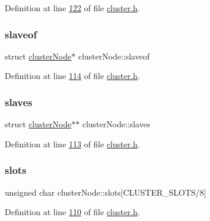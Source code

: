 Definition at line \hyperlink{cluster_8h_source_l00122}{122} of file \hyperlink{cluster_8h_source}{cluster.\+h}.

\mbox{\label{structclusterNode_aabb2536cdf382cec6d810aaf0ba9f58a}} 
\subsubsection{\texorpdfstring{slaveof}{slaveof}}
{\footnotesize\ttfamily struct \hyperlink{structclusterNode}{cluster\+Node}$\ast$ cluster\+Node\+::slaveof}



Definition at line \hyperlink{cluster_8h_source_l00114}{114} of file \hyperlink{cluster_8h_source}{cluster.\+h}.

\mbox{\label{structclusterNode_a35eac3f31a0acdbb1cf8d20fff406da6}} 
\subsubsection{\texorpdfstring{slaves}{slaves}}
{\footnotesize\ttfamily struct \hyperlink{structclusterNode}{cluster\+Node}$\ast$$\ast$ cluster\+Node\+::slaves}



Definition at line \hyperlink{cluster_8h_source_l00113}{113} of file \hyperlink{cluster_8h_source}{cluster.\+h}.

\mbox{\label{structclusterNode_a8c8302e4633d2d0094fa621ecfcf1b52}} 
\subsubsection{\texorpdfstring{slots}{slots}}
{\footnotesize\ttfamily unsigned char cluster\+Node\+::slots\mbox{[}C\+L\+U\+S\+T\+E\+R\+\_\+\+S\+L\+O\+TS/8\mbox{]}}



Definition at line \hyperlink{cluster_8h_source_l00110}{110} of file \hyperlink{cluster_8h_source}{cluster.\+h}.

\mbox{\label{structclusterNode_a871c18dd4ac7662af3e8fc3c699ece81}} 
